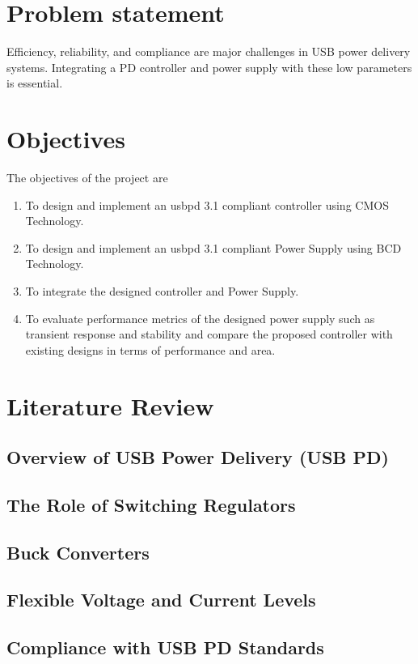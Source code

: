 \section[Problem statement]{\textbf{Problem statement}}

Efficiency, reliability, and compliance are major challenges in USB power delivery systems. Integrating a PD controller and power supply with these low parameters is essential.


\section[Objectives]{\textbf{Objectives}}
The objectives of the project are
\begin{enumerate}
\item To design and implement an \gls{usbpd} 3.1 compliant controller using CMOS Technology.
\item To design and implement an \gls{usbpd} 3.1 compliant Power Supply using BCD Technology.
\item To integrate the designed controller and Power Supply.
\item To evaluate performance metrics of the designed power supply such as transient response and stability and compare the proposed controller with existing designs in terms of performance and area.
\end{enumerate}

\section[Literature Review]{\textbf{Literature Review}}
\subsection{Overview of USB Power Delivery (USB PD)}
\subsection{The Role of Switching Regulators}
\subsection{Buck Converters}
\subsection{Flexible Voltage and Current Levels}
\subsection{Compliance with USB PD Standards}

